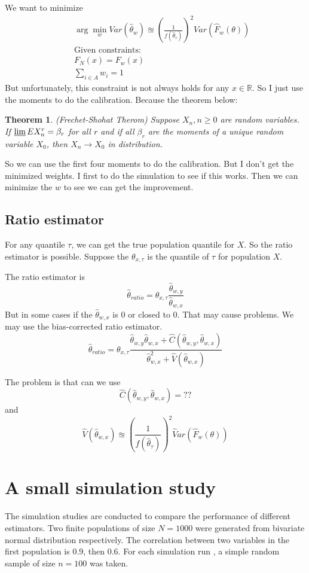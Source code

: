 \documentclass[]{article}
\newtheorem{theorem}{Theorem}
\begin{document}
We want to minimize
\begin{eqnarray}
&& \arg\min_{w} Var\left( \hat\theta_w\right) \approxeq \left(\frac{1}{f(\hat\theta_{\tau})} \right)^2 Var \left(\hat F_w(\theta)\right) \\
&& \text{Given constraints:}\nonumber\\
&& F_N(x)=F_w(x)\nonumber\\
&& \sum_{i\in A} w_i=1\nonumber
\end{eqnarray}
But unfortunately, this constraint is not always holds for any $x\in \mathbb{R}$. So I just use the moments to do the calibration. Because the theorem below:
\begin{theorem}
	(Frechet-Shohat Therom) Suppose ${X_n},n \geq 0$ are random variables. If $\varliminf EX_n^r=\beta_r$ for all $r$ and if all $\beta_r$ are the moments of a unique random variable $X_0$, then $X_n\longrightarrow X_0$ in distribution.
\end{theorem}

So we can use the first four moments to do the calibration. But I don't get the minimized weights.  I first to do the simulation to see if this works. Then we can minimize the $w$ to see we can get the improvement.

\subsection{Ratio estimator}
For any quantile $\tau$, we can get the true population quantile for $X$. So the ratio estimator is possible. Suppose the $\theta_{x,\tau}$ is the quantile of $\tau$ for population $X$.

The ratio estimator is $$ \hat\theta_{ratio}= \theta_{x,\tau}\frac{\hat\theta_{w,y}}{\hat\theta_{w,x}} $$
 But in some cases if the $\hat\theta_{w,x}$ is 0 or closed to 0. That may cause problems.
 We may use the bias-corrected ratio estimator. 
 $$ \hat\theta_{ratio}= \theta_{x,\tau}\frac{\hat\theta_{w,y}\hat\theta_{w,x}+\hat C\left(\hat\theta_{w,y},\hat\theta_{w,x} \right) }{\hat\theta_{w,x}^2+\hat V\left( \hat\theta_{w,x}\right) } $$
 
 The problem is that can we use $$\hat C\left(\hat\theta_{w,y},\hat\theta_{w,x} \right) =??$$
 and $$ \hat  V\left( \hat\theta_{w,x}\right) \approxeq \left(\frac{1}{f(\hat\theta_{\tau})} \right)^2 \hat Var \left(\hat F_w(\theta)\right)$$
 
 \section{A small simulation study}
 The simulation studies are conducted to compare the performance of different estimators. Two finite populations of size $N=1000$ were generated from bivariate normal distribution respectively. The correlation between two variables in the first population is 0.9, then 0.6. For each simulation run , a simple random sample of size $n=100$ was taken.
 
\end{document}
